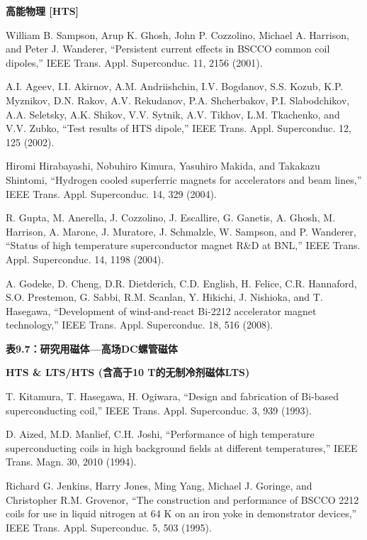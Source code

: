 \noindent \textbf{高能物理 [HTS]}

\noindent [9.337] William B. Sampson, Arup K. Ghosh, John P. Cozzolino, Michael A. Harrison,
and Peter J. Wanderer, ``Persistent current effects in BSCCO common coil
dipoles,” IEEE Trans. Appl. Superconduc. 11, 2156 (2001).

\noindent [9.338] A.I. Ageev, I.I. Akirnov, A.M. Andriishchin, I.V. Bogdanov, S.S. Kozub, K.P.
Myznikov, D.N. Rakov, A.V. Rekudanov, P.A. Shcherbakov, P.I. Slabodchikov,
A.A. Seletsky, A.K. Shikov, V.V. Sytnik, A.V. Tikhov, L.M. Tkachenko, and
V.V. Zubko, ``Test results of HTS dipole,” IEEE Trans. Appl. Superconduc. 12,
125 (2002).

\noindent [9.339] Hiromi Hirabayashi, Nobuhiro Kimura, Yasuhiro Makida, and Takakazu Shintomi,
``Hydrogen cooled superferric magnets for accelerators and beam lines,”
IEEE Trans. Appl. Superconduc. 14, 329 (2004).

\noindent [9.340] R. Gupta, M. Anerella, J. Cozzolino, J. Escallire, G. Ganetis, A. Ghosh, M. Harrison,
A. Marone, J. Muratore, J. Schmalzle, W. Sampson, and P. Wanderer,
``Status of high temperature superconductor magnet R\&D at BNL,” IEEE Trans.
Appl. Superconduc. 14, 1198 (2004).

\noindent [9.341] A. Godeke, D. Cheng, D.R. Dietderich, C.D. English, H. Felice, C.R. Hannaford,
S.O. Prestemon, G. Sabbi, R.M. Scanlan, Y. Hikichi, J. Nishioka, and T. Hasegawa,
``Development of wind-and-react Bi-2212 accelerator magnet technology,”
IEEE Trans. Appl. Superconduc. 18, 516 (2008).

\noindent \textbf{表9.7：研究用磁体---高场DC螺管磁体}

\noindent \textbf{HTS \& LTS/HTS (含高于10 T的无制冷剂磁体LTS)}

\noindent [9.342] T. Kitamura, T. Hasegawa, H. Ogiwara, ``Design and fabrication of Bi-based
superconducting coil,” IEEE Trans. Appl. Superconduc. 3, 939 (1993).

\noindent [9.343] D. Aized, M.D. Manlief, C.H. Joshi, ``Performance of high temperature superconducting
coils in high background fields at different temperatures,” IEEE Trans.
Magn. 30, 2010 (1994).

\noindent [9.344] Richard G. Jenkins, Harry Jones, Ming Yang, Michael J. Goringe, and Christopher
R.M. Grovenor, ``The construction and performance of BSCCO 2212 coils
for use in liquid nitrogen at 64 K on an iron yoke in demonstrator devices,” IEEE
Trans. Appl. Superconduc. 5, 503 (1995).

